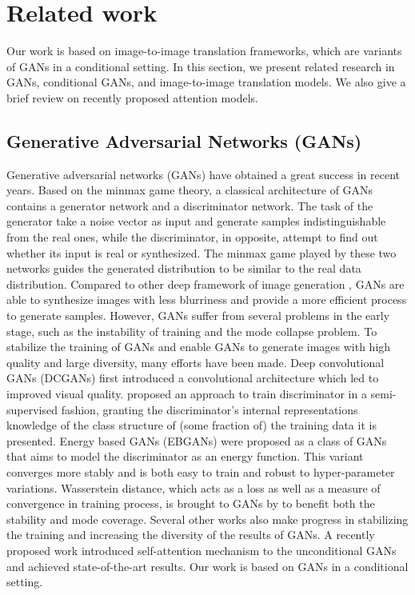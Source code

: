 \section{Related work}
Our work is based on image-to-image translation frameworks, which are variants of GANs in a conditional setting. In this section, we present related research in GANs, conditional GANs, and image-to-image translation models. We also give a brief review on recently proposed attention models.
\subsection{Generative Adversarial Networks (GANs)}
Generative adversarial networks (GANs) \cite{GANs} have obtained a great success in recent years.
Based on the minmax game theory, a classical architecture of GANs contains a generator network and a discriminator network. The task of the generator take a noise vector as input and generate samples indistinguishable from the real ones, while the discriminator, in opposite, attempt to find out whether its input is real or synthesized. The minmax game played by these two networks guides the generated distribution to be similar to the real data distribution. Compared to other deep  framework of image generation \cite{VAEs, PixelCNN}, GANs are able to synthesize images with less blurriness and provide a more efficient process to generate samples. However, GANs suffer from several problems in the early stage, such as the instability of training and the mode collapse problem. To stabilize the training of GANs and enable GANs to generate images with high quality and large diversity, many efforts have been made. Deep convolutional GANs (DCGANs) \cite{DCGANs} first introduced a convolutional architecture which led to improved visual quality. \cite{Improved_Techniques} proposed an approach to train discriminator in a semi-supervised fashion, granting the discriminator's internal representations knowledge of the class structure of (some fraction of) the training data it is presented. Energy based GANs (EBGANs) \cite{EBGANs}  were proposed as a class of GANs that aims to model the discriminator as an energy function. This variant converges more stably and is both easy to train and robust to hyper-parameter variations. Wasserstein distance, which acts as a loss as well as a measure of convergence in training process, is brought to GANs by \cite{WGANs, WGAN-GP} to benefit both the stability and mode coverage. Several other works \cite{LSGANs, BEGANs, DRAGANs} also make progress in stabilizing the training and increasing the diversity of the results of GANs. A recently proposed work introduced self-attention mechanism to the unconditional GANs and achieved state-of-the-art results. Our work is based on GANs in a conditional setting.
%

